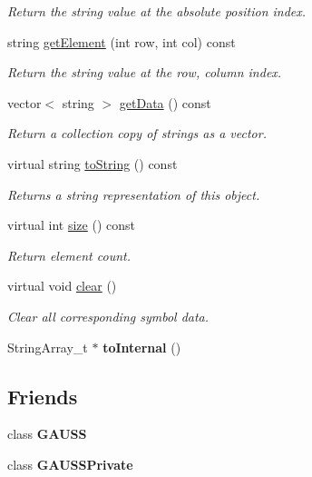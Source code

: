 \begin{DoxyCompactItemize}
\begin{DoxyCompactList}\small\item\em Return the string value at the absolute position {\itshape index}. \end{DoxyCompactList}\item 
string \hyperlink{class_g_e_string_array_abc4a1ba61662b8f33262eb6fb1bd4ebe}{get\+Element} (int row, int col) const
\begin{DoxyCompactList}\small\item\em Return the string value at the {\itshape row}, {\itshape column} index. \end{DoxyCompactList}\item 
vector$<$ string $>$ \hyperlink{class_g_e_string_array_aa61b05c339d69922cc3469737cedebdb}{get\+Data} () const
\begin{DoxyCompactList}\small\item\em Return a collection copy of strings as a vector. \end{DoxyCompactList}\item 
virtual string \hyperlink{class_g_e_string_array_abfb8d92b23e04bfedf6683138f533e62}{to\+String} () const
\begin{DoxyCompactList}\small\item\em Returns a string representation of this object. \end{DoxyCompactList}\item 
virtual int \hyperlink{class_g_e_string_array_ac04d8fa75ee1b940dbe7855dc7d35c25}{size} () const
\begin{DoxyCompactList}\small\item\em Return element count. \end{DoxyCompactList}\item 
virtual void \hyperlink{class_g_e_string_array_a9bd5bd32a9efeb1e74128bd1d7c5c57d}{clear} ()
\begin{DoxyCompactList}\small\item\em Clear all corresponding symbol data. \end{DoxyCompactList}\item 
\mbox{\label{class_g_e_string_array_a12f6d2208ce7f7e2dd564cb72d3de222}} 
String\+Array\+\_\+t $\ast$ {\bfseries to\+Internal} ()
\end{DoxyCompactItemize}
\subsection*{Friends}
\begin{DoxyCompactItemize}
\item 
\mbox{\label{class_g_e_string_array_abc89e64d0ec6c939575c3125753c6309}} 
class {\bfseries G\+A\+U\+SS}
\item 
\mbox{\label{class_g_e_string_array_a2e5e14117f0e69078f45b8d512f056de}} 
class {\bfseries G\+A\+U\+S\+S\+Private}
\end{DoxyCompactItemize}
